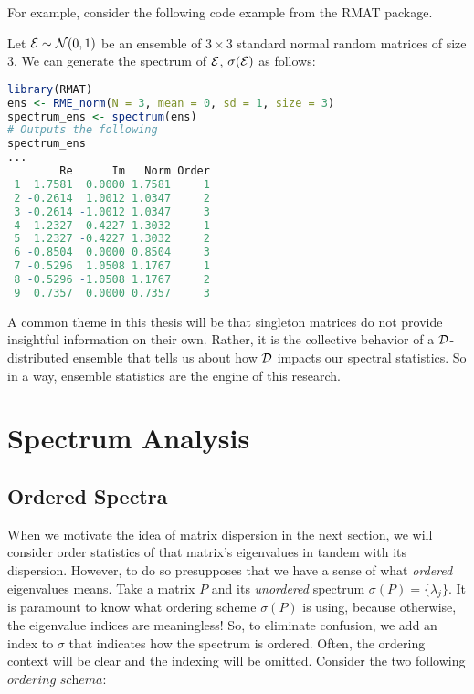 \medskip
\noindent For example, consider the following code example from the RMAT package.
\begin{code}
Let $\mathcal{E} \sim \mathcal{N}(0,1)$ be an ensemble of $3 \times 3$ standard normal random matrices of size $3$. We can generate the spectrum of $\mathcal{E}$, $\sigma(\mathcal{E})$ as follows:
\end{code}

\begin{lstlisting}[language=R]
library(RMAT)
ens <- RME_norm(N = 3, mean = 0, sd = 1, size = 3)
spectrum_ens <- spectrum(ens)
# Outputs the following
spectrum_ens
...
        Re      Im   Norm Order
 1  1.7581  0.0000 1.7581     1
 2 -0.2614  1.0012 1.0347     2
 3 -0.2614 -1.0012 1.0347     3
 4  1.2327  0.4227 1.3032     1
 5  1.2327 -0.4227 1.3032     2
 6 -0.8504  0.0000 0.8504     3
 7 -0.5296  1.0508 1.1767     1
 8 -0.5296 -1.0508 1.1767     2
 9  0.7357  0.0000 0.7357     3
\end{lstlisting}

A common theme in this thesis will be that singleton matrices do not provide insightful information on their own. Rather, it is the collective behavior of a $\mathcal{D}$-distributed ensemble that tells us about how $\mathcal{D}$ impacts our spectral statistics. So in a way, ensemble statistics are the engine of this research.


\newpage
\section{Spectrum Analysis}


\subsection{Ordered Spectra}


When we motivate the idea of matrix dispersion in the next section, we will consider order statistics of that matrix's eigenvalues in tandem with its dispersion. However, to do so presupposes that we have a sense of what \textit{ordered} eigenvalues means. Take a matrix $P$ and its \textit{unordered} spectrum $\sigma(P) = \{\lambda_j\}$. It is paramount to know what ordering scheme $\sigma(P)$ is using, because otherwise, the eigenvalue indices are meaningless! So, to eliminate confusion, we add an index to $\sigma$ that indicates how the spectrum is ordered. Often, the ordering context will be clear and the indexing will be omitted. Consider the two following $\textit{ordering schema}$:

